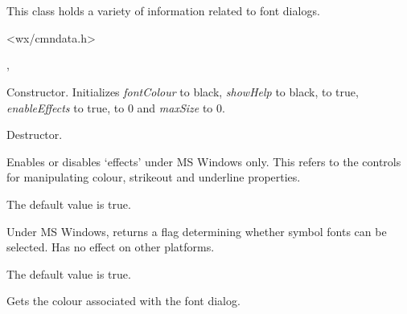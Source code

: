 \section{}\label{wxfontdata}


This class holds a variety of information related to font dialogs.




<wx/cmndata.h>


, 




Constructor. Initializes {\it fontColour} to black, {\it showHelp} to black,
 to true, {\it enableEffects} to true,
 to 0 and {\it maxSize} to 0.



Destructor.



Enables or disables `effects' under MS Windows only. This refers to the
controls for manipulating colour, strikeout and underline properties.

The default value is true.



Under MS Windows, returns a flag determining whether symbol fonts can be selected. Has no
effect on other platforms.

The default value is true.



Gets the colour associated with the font dialog.

